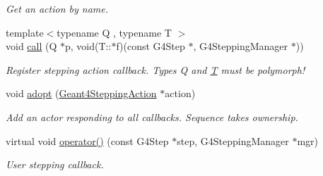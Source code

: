 \begin{DoxyCompactItemize}
\begin{DoxyCompactList}\small\item\em Get an action by name. \item\end{DoxyCompactList}\item 
{\footnotesize template$<$typename Q , typename T $>$ }\\void \hyperlink{class_d_d4hep_1_1_simulation_1_1_geant4_stepping_action_sequence_a80706eac8c225ea3773259f024d76e5e}{call} (Q $\ast$p, void(T::$\ast$f)(const G4Step $\ast$, G4SteppingManager $\ast$))
\begin{DoxyCompactList}\small\item\em Register stepping action callback. Types Q and \hyperlink{class_t}{T} must be polymorph! \item\end{DoxyCompactList}\item 
void \hyperlink{class_d_d4hep_1_1_simulation_1_1_geant4_stepping_action_sequence_a39d7f26d436a3f512c2b467bad9d4beb}{adopt} (\hyperlink{class_d_d4hep_1_1_simulation_1_1_geant4_stepping_action}{Geant4SteppingAction} $\ast$action)
\begin{DoxyCompactList}\small\item\em Add an actor responding to all callbacks. Sequence takes ownership. \item\end{DoxyCompactList}\item 
virtual void \hyperlink{class_d_d4hep_1_1_simulation_1_1_geant4_stepping_action_sequence_a51e1c2c59da560ac9bc6fc0d249e06dc}{operator()} (const G4Step $\ast$step, G4SteppingManager $\ast$mgr)
\begin{DoxyCompactList}\small\item\em User stepping callback. \item\end{DoxyCompactList}\end{DoxyCompactItemize}
